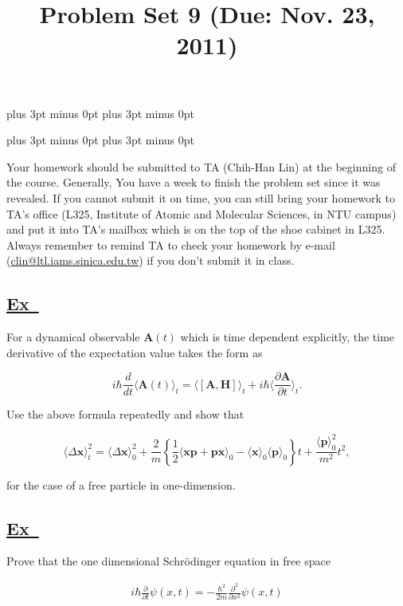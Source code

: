 \documentclass[a4paper,12pt]{article}
\newcommand{\excercise}{\addtocounter{section}{+1}
\subsection*{\underline{Ex~\thesection}}}
\newcommand{\sdelta}{\Delta}
\newcommand{\expect}[2]{\langle #1\rangle_{#2}}
\begin{document}
\abovedisplayskip=-6pt plus 3pt minus 0pt
\belowdisplayskip=8pt plus 3pt minus 0pt

\abovedisplayshortskip=-6pt plus 3pt minus 0pt
\belowdisplayshortskip=8pt plus 3pt minus 0pt

\title{Problem Set 9 (Due: Nov. 23, 2011)}
\maketitle

Your homework should be submitted to TA (Chih-Han Lin) at the  beginning of the course. Generally, You have a week to finish the problem set since it was revealed. If you cannot submit it on time, you can still bring your homework to TA's office (L325, Institute of Atomic and Molecular Sciences, in NTU campus) and put it into TA's mailbox which is on the top of the shoe cabinet in L325. Always remember to remind TA to check your homework by e-mail (\url{clin@ltl.iams.sinica.edu.tw}) if you don't submit it in class.

%


\excercise 

 For a dynamical observable $ \mathbf{A}(t) $ which is time dependent explicitly, the time derivative of the expectation value takes the form as
 
 $$
 i\hbar\frac{d}{dt}\expect{\mathbf{A}(t)}{t}=\expect{[\mathbf{A},\mathbf{H}]}{t}+
 i\hbar\Big\langle\frac{\partial \mathbf{A}}{\partial t}\Big\rangle_t.
 $$
 
Use the above formula repeatedly and show that
 
 $$
 \expect{\sdelta \bm{x}}{t}^2= \expect{\sdelta \bm{x}}{0}^2+\frac{2}{m}\left\{\frac{1}{2}\expect{\bm{xp}+\bm{px}}{0}-\expect{\bm{x}}{0}\expect{\bm{p}}{0}\right\}t+\frac{\expect{\bm{p}}{0}^2}{m^2}t^2,
 $$
 
\noindent for the case of a free particle in one-dimension.

\excercise

Prove that the one dimensional Schr\"{o}dinger equation in free space

\begin{align*}
i\hbar\frac{\partial}{\partial t}\psi(x,t)=-\frac{\hbar^2}{2m}\frac{\partial^2}{\partial x^2}\psi(x, t)
\end{align*} 
\end{document}
